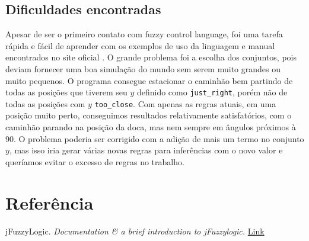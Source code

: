 \documentclass{article}
\begin{document}
\pagebreak

\subsection{Dificuldades encontradas}

Apesar de ser o primeiro contato com fuzzy control language, foi uma tarefa rápida e fácil de aprender com os exemplos de uso da linguagem e manual encontrados no site oficial \cite{ref01}. O grande problema foi a escolha dos conjuntos, pois deviam fornecer uma boa simulação do mundo sem serem muito grandes ou muito pequenos.
O programa consegue estacionar o caminhão bem partindo de todas as posições que tiverem seu $y$ definido como \texttt{just\_right}, porém não de todas as posições com $y$ \texttt{too\_close}.
Com apenas as regras atuais, em uma posição muito perto, conseguimos resultados relativamente satisfatórios, com o caminhão parando na posição da doca, mas nem sempre em ângulos próximos à 90\degree.
O problema poderia ser corrigido com a adição de mais um termo no conjunto $y$, mas isso iria gerar várias novas regras para inferências com o novo valor e queríamos evitar o excesso de regras no trabalho.


\section*{Referência}


\begin{thebibliography}{1}

   jFuzzyLogic. {\em Documentation \& a brief introduction to jFuzzylogic.} \href{jfuzzylogic.sourceforge.net/html/manual.html}{Link}
  
  \end{thebibliography}
\end{document}
